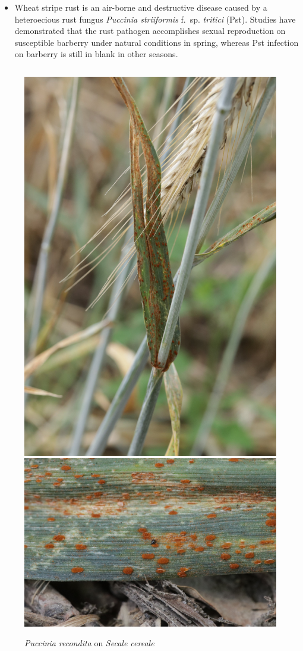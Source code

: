 \documentclass[10pt,dvipsnames,ignorenonframetext,aspectratio=169]{beamer}
\providecommand{\tightlist}{%
  \setlength{\itemsep}{0pt}\setlength{\parskip}{0pt}}
\begin{document}
\begin{frame}{}
\begin{figure}
\begin{columns}
\end{columns}\end{figure}

\footnotesize

\begin{itemize}
\tightlist
\item
  Wheat stripe rust is an air-borne and destructive disease caused by a
  heteroecious rust fungus \textit{Puccinia striiformis }f.~sp.
  \textit{tritici} (Pst). Studies have demonstrated that the rust
  pathogen accomplishes sexual reproduction on susceptible barberry
  under natural conditions in spring, whereas Pst infection on barberry
  is still in blank in other seasons.
\end{itemize}
\end{frame}

\begin{frame}{}
\protect\hypertarget{section-7}{}
\begin{figure}\caption{\textit{Puccinia recondita} on \textit{Secale cereale}} 
\begin{columns}\includegraphics[width=0.72\linewidth]{../images/FYCo7NmWQAkXvRB}\includegraphics[width=0.6\linewidth]{../images/FYCo7NwXgAYe9r1} \\ 

\end{columns}
\end{figure}
\end{frame}
\end{document}
